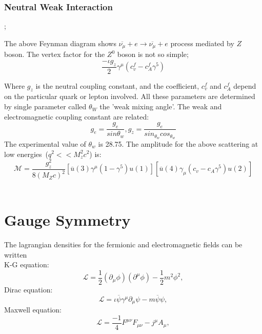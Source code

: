 \subsubsection{Neutral Weak Interaction}
\begin{center}
;
\end{center}

The above Feynman diagram shows $\overline{\nu_{\mu}}+e\rightarrow\overline{\nu_{\mu}}+e$ process mediated by $Z$ boson.
The vertex factor for the $Z^{0}$ boson is not so simple;
\begin{equation}
\frac{-\iota g_{z}}{2}\gamma^{\mu}(c_{v}^{f}-c_{A}^{f}\gamma^{5})
\end{equation}

Where $g_{z}$ is the neutral coupling constant, and the coefficient, $c_{v}^{f}$ and $c_{A}^{f}$ depend on the particular quark or lepton involved. All these parameters are determined by single parameter called $\theta_{W}$ the 'weak mixing angle'. The weak and electromagnetic coupling constant are related:
\begin{equation}
g_{e}=\frac{g_{e}}{sin\theta_{w}},    g_{z}=\frac{g_{e}}{sin_{\theta_{w}}cos_{\theta_{w}}}
\end{equation}
The experimental value of $\theta_{w}$ is 28.75. The amplitude for the above scattering at low energies~($q^{2}<<M_{z}^{2}c^{2}$) is:
\begin{equation}
\mathcal{M}=\frac{g_{z}^2}{8(M_{Z}c)^2}[\overline{u}(3)\gamma^{\mu}(1-\gamma^{5})u(1)][\overline{u}(4)\gamma_{\mu}(c_{v}-c_{A}\gamma^{5})u(2)]
\end{equation}\\

\section{Gauge Symmetry}
The lagrangian densities for the fermionic and electromagnetic fields can be written~\cite{Quarks&lepton87}\\
K-G equation:
\begin{equation}
\mathcal{L}=\frac{1}{2}(\partial_{\mu}\phi)(\partial^{\mu}\phi)-\frac{1}{2}m^{2}\phi^{2},
\end{equation}
Dirac equation:
\begin{equation}
\mathcal{L}=\iota\overline{\psi}\gamma^{\mu}\partial_{\mu}\psi-m\overline{\psi}\psi,
\end{equation}
Maxwell equation:
\begin{equation}
\mathcal{L}=\frac{-1}{4}F^{\mu\nu}F_{\mu\nu}-j^{\mu}A_{\mu},
\end{equation}

